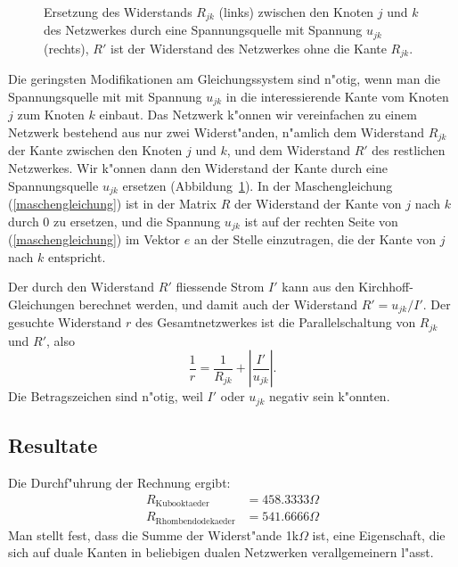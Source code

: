 \documentclass[a4paper,12pt]{article}
\begin{document}
\begin{figure}
\centering

\caption{Ersetzung des Widerstands $R_{jk}$ (links)
zwischen den Knoten $j$ und $k$
des Netzwerkes durch eine Spannungsquelle mit Spannung $u_{jk}$ (rechts),
$R'$ ist der Widerstand des Netzwerkes ohne die Kante $R_{jk}$.
\label{spannungsquelle}}
\end{figure}
Die geringsten Modifikationen am Gleichungssystem sind n"otig, wenn
man die Spannungsquelle mit mit Spannung $u_{jk}$ in die interessierende
Kante vom Knoten $j$ zum Knoten $k$ einbaut.
Das Netzwerk k"onnen wir vereinfachen zu einem Netzwerk bestehend
aus nur zwei Widerst"anden, n"amlich dem Widerstand $R_{jk}$ der Kante zwischen
den Knoten $j$ und $k$, und dem Widerstand $R'$ des restlichen Netzwerkes.
Wir k"onnen dann den Widerstand der Kante durch eine Spannungsquelle
$u_{jk}$ ersetzen (Abbildung~\ref{spannungsquelle}). 
In der Maschengleichung (\ref{maschengleichung}) ist in der Matrix $R$
der Widerstand der Kante von $j$ nach $k$ durch $0$ zu ersetzen,
und die Spannung $u_{jk}$ ist auf der rechten Seite von
(\ref{maschengleichung}) im Vektor $e$ an der Stelle einzutragen, die
der Kante von $j$ nach $k$ entspricht.

Der durch den Widerstand $R'$ fliessende Strom $I'$ kann aus den
Kirchhoff-Gleichungen berechnet werden, und damit
auch der Widerstand $R'=u_{jk}/I'$.
Der gesuchte Widerstand $r$ des Gesamtnetzwerkes ist die Parallelschaltung
von $R_{jk}$ und $R'$, also
\[
\frac1r=\frac1{R_{jk}}+\left|\frac{I'}{u_{jk}}\right|.
\]
Die Betragszeichen sind n"otig, weil $I'$ oder $u_{jk}$ negativ sein k"onnten.

\subsection{Resultate}
Die Durchf"uhrung der Rechnung ergibt:
\begin{align*}
R_{\text{Kubooktaeder}}
&=
458.3333\Omega
\\
R_{\text{Rhombendodekaeder}}
&=
541.6666\Omega
\end{align*}
Man stellt fest, dass die Summe der Widerst"ande 1k$\Omega$ ist, 
eine Eigenschaft, die sich auf duale Kanten in beliebigen dualen
Netzwerken verallgemeinern l"asst.
\end{document}
